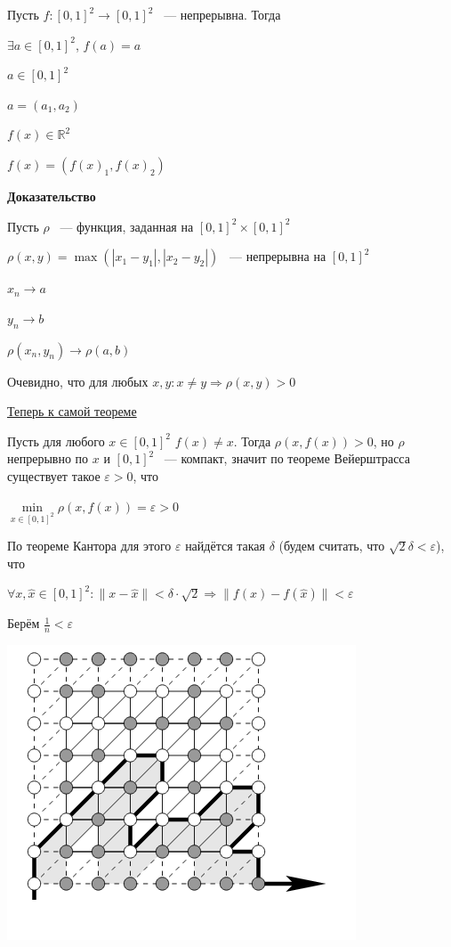 \documentclass{article}
\begin{document}
			Пусть $f : [0, 1]^2 \rightarrow [0, 1]^2$ ~--- непрерывна. Тогда
			
			$\exists a \in [0, 1]^2$, $f(a) = a$
			
			$a \in [0, 1]^2$
			
			$a = (a_1, a_2)$
			
			$f(x) \in \mathbb{R}^2$
			
			$f(x) = (f(x)_1, f(x)_2)$
			
			\textbf{Доказательство}
			
				Пусть $\rho$ ~--- функция, заданная на $[0, 1]^2 \times [0, 1]^2$
				
				$\rho(x, y) = \max (|x_1 - y_1|, |x_2 - y_2|)$ ~--- непрерывна на $[0, 1]^2$
				
				$x_n \rightarrow a$
				
				$y_n \rightarrow b$
				
				$\rho(x_n, y_n) \rightarrow \rho(a, b)$
				
				Очевидно, что для любых $x, y: x \neq y \Rightarrow \rho(x, y) > 0$
				
				\underline{Теперь к самой теореме}
				
				Пусть для любого $x \in [0, 1]^2$ $f(x) \neq x$. Тогда $\rho(x, f(x)) > 0$, но $\rho$ непрерывно по $x$ и $[0, 1]^2$ ~--- компакт, значит по теореме Вейерштрасса существует такое $\varepsilon > 0$, что
				
				$\min\limits_{x \in [0, 1]^2} \rho(x, f(x)) = \varepsilon > 0$
				
				По теореме Кантора для этого $\varepsilon$ найдётся такая $\delta$ (будем считать, что $\sqrt{2} \delta < \varepsilon$), что
				
				$\forall x, \widehat{x} \in [0, 1]^2 : \| x - \widehat{x} \| < \delta \cdot \sqrt{2} \Rightarrow \| f(x) - f(\widehat{x}) \| < \varepsilon$
				
				Берём $\frac{1}{n} < \varepsilon$
				
				\includegraphics[scale=0.45]{HEXTHEOREM.png}
				
\end{document}
